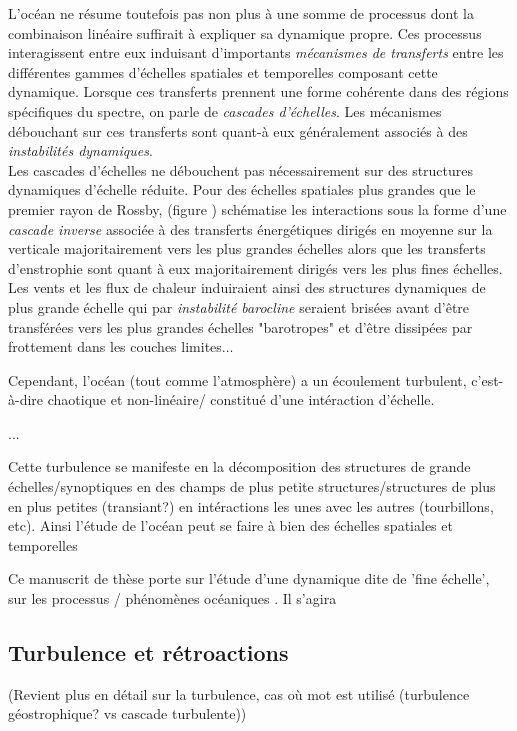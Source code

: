 L'océan ne résume toutefois pas non plus à une somme de processus dont la combinaison linéaire suffirait à expliquer sa dynamique propre. Ces processus interagissent entre eux induisant d'importants \textit {mécanismes de transferts} entre les différentes gammes d'échelles spatiales et temporelles composant cette dynamique. Lorsque ces transferts prennent une forme cohérente dans des régions spécifiques du spectre, on parle de \textit{cascades d'échelles}. Les mécanismes débouchant sur ces transferts sont quant-à eux généralement associés à des \textit{instabilités dynamiques}.\\
Les cascades d'échelles ne débouchent pas nécessairement sur des structures dynamiques d'échelle réduite. Pour des échelles spatiales plus grandes que le premier rayon de Rossby, \cite{salmon_baroclinic_1980} (figure ) schématise les interactions sous la forme d'une \textit{cascade inverse} associée à des transferts énergétiques dirigés en moyenne sur la verticale majoritairement vers les plus grandes échelles alors que les transferts d'enstrophie sont quant à eux majoritairement dirigés vers les plus fines échelles. Les vents et les flux de chaleur induiraient ainsi des structures dynamiques de plus grande échelle qui par \textit{instabilité barocline} seraient brisées avant d'être transférées vers les plus grandes échelles "barotropes" et d'être dissipées par frottement dans les couches limites...

\color{black}

Cependant, l'océan (tout comme l'atmosphère) a un écoulement turbulent, c'est-à-dire chaotique et non-linéaire/ constitué d'une intéraction d'échelle.

...

Cette turbulence se manifeste en la décomposition des structures de grande échelles/synoptiques en des champs de plus petite structures/structures de plus en plus petites (transiant?) en intéractions les unes avec les autres (tourbillons, etc). Ainsi l'étude de l'océan peut se faire à bien des échelles spatiales et temporelles

Ce manuscrit de thèse porte sur l'étude d'une dynamique dite de 'fine échelle', sur les processus / phénomènes océaniques . Il s'agira 

\subsection{Turbulence et rétroactions}
(Revient plus en détail sur la turbulence, cas où mot est utilisé (turbulence géostrophique? vs cascade turbulente))

